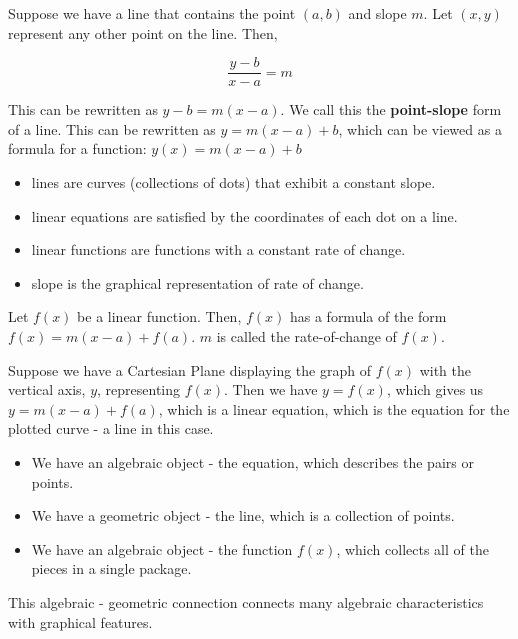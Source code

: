 \documentclass{ximera}
\begin{document}
Suppose we have a line that contains the point $(a,b)$ and slope $m$.  Let $(x,y)$ represent any other point on the line.  Then,



\[
\frac{y-b}{x-a} = m
\]

This can be rewritten as $y - b = m(x - a)$. We call this the \textbf{\textcolor{purple!85!blue}{point-slope}} form of a line.  This can be rewritten as $y = m(x - a) + b$, which can be viewed as a formula for a function: $y(x) = m(x - a) + b$ \\




\begin{itemize}
\item lines are curves (collections of dots) that exhibit a constant slope.
\item linear equations are satisfied by the coordinates of each dot on a line.
\item linear functions are functions with a constant rate of change.
\item slope is the graphical representation of rate of change.
\end{itemize}
















Let $f(x)$ be a linear function.  Then, $f(x)$ has a formula of the form $f(x) = m(x-a) + f(a)$.  $m$ is called the rate-of-change of $f(x)$.


Suppose we have a Cartesian Plane displaying the graph of $f(x)$ with the vertical axis, $y$, representing $f(x)$.  Then we have $y = f(x)$, which gives us $y = m(x-a) + f(a)$, which is a linear equation, which is the equation for the plotted curve - a line in this case.

\begin{itemize}
\item We have an algebraic object - the equation, which describes the pairs or points. 
\item We have a geometric object - the line, which is a collection of points. 
\item We have an algebraic object - the function $f(x)$, which collects all of the pieces in a single package. 
\end{itemize}


This algebraic - geometric connection connects many algebraic characteristics with graphical features.
\end{document}
